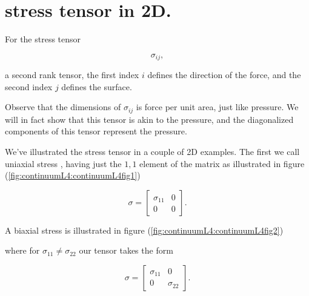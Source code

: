 \label{chap:continuumL4}

\section{stress tensor in 2D.}

For the stress tensor

\begin{equation}\label{eqn:continuumL4:10}
\sigma_{ij},
\end{equation}

a second rank tensor, the first index $i$ defines the direction of the force, and the second index $j$ defines the surface.

Observe that the dimensions of $\sigma_{ij}$ is force per unit area, just like pressure.  We will in fact show that this tensor is akin to the pressure, and the diagonalized components of this tensor represent the pressure.

We've illustrated the stress tensor in a couple of 2D examples.  The first we call uniaxial stress , having just the $1,1$ element of the matrix as illustrated in figure (\ref{fig:continuumL4:continuumL4fig1})


\begin{equation}\label{eqn:continuumL4:30}
\sigma = 
\begin{bmatrix}
\sigma_{11} & 0 \\
0 & 0
\end{bmatrix}.
\end{equation}

A biaxial stress  is illustrated in figure (\ref{fig:continuumL4:continuumL4fig2})

where for $\sigma_{11} \ne \sigma_{22}$ our tensor takes the form

\begin{equation}\label{eqn:continuumL4:50}
\sigma = 
\begin{bmatrix}
\sigma_{11} & 0 \\
0 & \sigma_{22}
\end{bmatrix}.
\end{equation}

